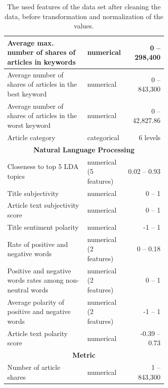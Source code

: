 \documentclass{article}
\begin{document}
\begin{table}
\begin{tabular}{|p{0.5\linewidth}|p{0.15\linewidth}|r|}
        \\
        \hline
        Average max. number of shares of articles in keywords & numerical & 0 -- 298,400
        \\
        \hline
        Average number of shares of articles in the best keyword & numerical & 0 -- 843,300
        \\
        \hline
        Average number of shares of articles in the worst keyword & numerical & 0 -- 42,827.86
        \\
        \hline
        Article category & categorical & 6 levels
        \\
        \hline
        \multicolumn{3}{|c|}{\textbf{Natural Language Processing}}
        \\
        \hline
        Closeness to top 5 LDA topics & numerical (5 features) & 0.02 -- 0.93
        \\
        \hline
        Title subjectivity & numerical & 0 -- 1
        \\
        \hline
        Article text subjectivity score & numerical & 0 -- 1
        \\
        \hline
        Title sentiment polarity & numerical & -1 -- 1
        \\
        \hline
        Rate of positive and negative words & numerical (2 features) & 0 -- 0.18
        \\
        \hline
        Positive and negative words rates among non-neutral words & numerical (2 features) & 0 -- 1
        \\
        \hline
        Average polarity of positive and negative words & numerical (2 features) & -1 -- 1
        \\
        \hline
        Article text polarity score & numerical & -0.39 -- 0.73
        \\
        \hline
        \multicolumn{3}{|c|}{\textbf{Metric}}
        \\
        \hline
        Number of article shares & numerical & 1 -- 843,300
        \\
        \hline
    \end{tabular}
    \caption{The used features of the data set after cleaning the data, before transformation and normalization of the values.}
    \label{tab:table}
\end{table}
\end{document}
